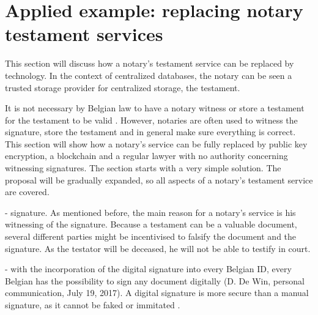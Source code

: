 \section{Applied example: replacing notary testament services}
\label{notary-will}

\iffalse
- this section will discuss the role of a notary in writing a testament and how this can be replaced by technology. The notary can be seen a trusted storage provider for centralized storage, the testament.

- It is not necessary by Belgian law to have a notary witness or store a testament \cite{eigen-testament}. However, they are still often used to witness the signature, store the testament and in general make sure everything is correct. This section will show a notary's service can be fully replaced by public key encryption, a blockchain and a regular lawyer, as the main difference between a regular lawyer and a notary is a notary's ability to witness a signature. The section starts with a very simple solution, but will gradually expand the proposal to make sure that by the end all aspects of a notary's testament service is covered.
\fi

This section will discuss how a notary's testament service can be replaced by technology. In the context of centralized databases, the notary can be seen a trusted storage provider for centralized storage, the testament.

It is not necessary by Belgian law to have a notary witness or store a testament for the testament to be valid \cite{eigen-testament}. However, notaries are often used to witness the signature, store the testament and in general make sure everything is correct. This section will show how a notary's service can be fully replaced by public key encryption, a blockchain and a regular lawyer with no authority concerning witnessing signatures. The section starts with a very simple solution. The proposal will be gradually expanded, so all aspects of a notary's testament service are covered.

\iffalse
- signature. As mentioned before, the main reason for a notary's service is his witnessing of the signature. Because a testament can be a valuable document, several different parties might be incentivised to falsify the document and the signature. As the testator will be deceased, he will not be able to testify in court. 

- with the incorporation of the digital signature into every Belgian ID, every Belgian has the possibility to sign any document digitally (D. De Win, personal communication, July 19, 2017). A digital signature is more secure than a manual signature, as it cannot be faked or immitated \cite{belgian-eid}.

